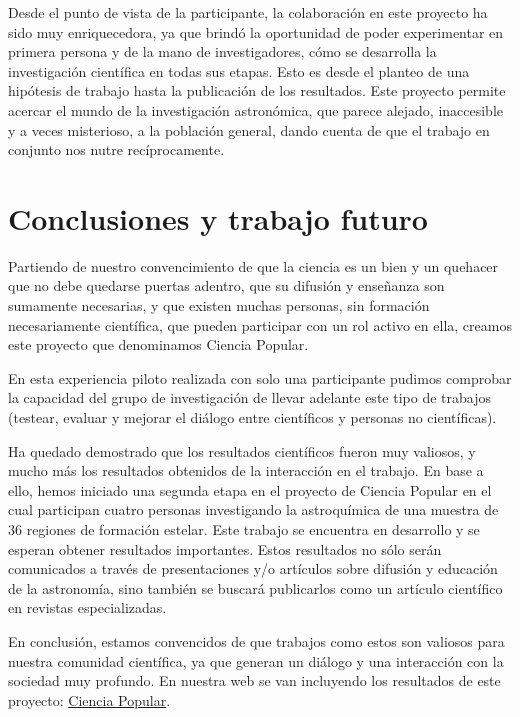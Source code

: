\documentclass[baaa]{baaa}
\begin{document}
Desde el punto de vista de la participante, la colaboración en este proyecto ha sido muy enriquecedora, ya que brindó la oportunidad de poder experimentar en primera persona y de la mano de investigadores, cómo se desarrolla la investigación científica en todas sus etapas. Esto es desde el planteo de una hipótesis de trabajo hasta la publicación de los resultados. Este proyecto permite acercar el mundo de la investigación astronómica, que parece alejado, inaccesible y a veces misterioso, a la población general, dando cuenta de que el trabajo en conjunto nos nutre recíprocamente.

\section{Conclusiones y trabajo futuro}

Partiendo de nuestro convencimiento  de que la ciencia es un bien y un quehacer que no debe quedarse puertas adentro, que su difusión y enseñanza son sumamente necesarias, y que existen muchas personas, sin formación necesariamente científica, que pueden participar con un rol activo en ella, creamos este proyecto que denominamos Ciencia Popular. 

En esta experiencia piloto realizada con solo una participante pudimos comprobar la capacidad del grupo de investigación de llevar adelante este tipo de trabajos (testear, evaluar y mejorar el diálogo entre científicos y personas no científicas). 

Ha quedado demostrado que los resultados científicos fueron muy valiosos, y mucho más los resultados obtenidos de la interacción en el trabajo. En base a ello, hemos iniciado una segunda etapa en el proyecto de Ciencia Popular en el cual participan cuatro personas investigando la astroquímica de una muestra de 36 regiones de formación estelar. Este trabajo se encuentra en desarrollo y se esperan obtener resultados importantes. Estos resultados no sólo serán comunicados a través de presentaciones y/o artículos sobre difusión y educación de la astronomía, sino también se buscará publicarlos como un artículo científico en revistas especializadas. 

En conclusión, estamos convencidos de que trabajos como estos son valiosos para nuestra comunidad científica, ya que generan un diálogo y una interacción con la sociedad muy profundo. En nuestra web se van incluyendo los resultados de este proyecto: \href{https://interestelariafe.wixsite.com/mediointerestelar/cienciapop}{Ciencia Popular}.
\end{document}
